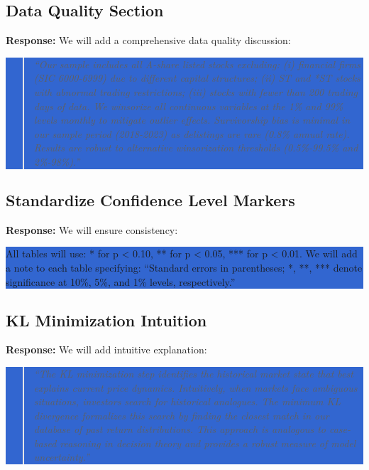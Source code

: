 \documentclass[12pt]{article}
\begin{document}
\subsection*{Data Quality Section}
\textbf{Response:} We will add a comprehensive data quality discussion:

\colorbox{highlight}{\parbox{\dimexpr\linewidth-2\fboxsep}{%
\begin{quote}
\textit{``Our sample includes all A-share listed stocks excluding: (i) financial firms (SIC 6000-6999) due to different capital structures; (ii) ST and *ST stocks with abnormal trading restrictions; (iii) stocks with fewer than 200 trading days of data. We winsorize all continuous variables at the 1\% and 99\% levels monthly to mitigate outlier effects. Survivorship bias is minimal in our sample period (2018-2023) as delistings are rare (0.8\% annual rate). Results are robust to alternative winsorization thresholds (0.5\%-99.5\% and 2\%-98\%).''}
\end{quote}
}}

\subsection*{Standardize Confidence Level Markers}
\textbf{Response:} We will ensure consistency:

\colorbox{highlight}{\parbox{\dimexpr\linewidth-2\fboxsep}{%
All tables will use: * for p < 0.10, ** for p < 0.05, *** for p < 0.01. We will add a note to each table specifying: ``Standard errors in parentheses; *, **, *** denote significance at 10\%, 5\%, and 1\% levels, respectively.''
}}

\subsection*{KL Minimization Intuition}
\textbf{Response:} We will add intuitive explanation:

\colorbox{highlight}{\parbox{\dimexpr\linewidth-2\fboxsep}{%
\begin{quote}
\textit{``The KL minimization step identifies the historical market state that best explains current price dynamics. Intuitively, when markets face ambiguous situations, investors search for historical analogues. The minimum KL divergence formalizes this search by finding the closest match in our database of past return distributions. This approach is analogous to case-based reasoning in decision theory and provides a robust measure of model uncertainty.''}
\end{quote}
}}
\end{document}
